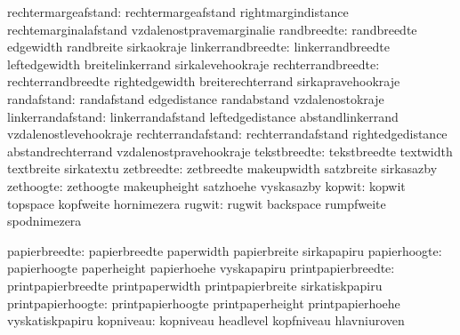           rechtermargeafstand:  rechtermargeafstand          rightmargindistance
                                rechtemarginalafstand        vzdalenostpravemarginalie
                  randbreedte:  randbreedte                  edgewidth
                                randbreite                   sirkaokraje
            linkerrandbreedte:  linkerrandbreedte            leftedgewidth
                                breitelinkerrand             sirkalevehookraje
           rechterrandbreedte:  rechterrandbreedte           rightedgewidth
                                breiterechterrand            sirkapravehookraje
                  randafstand:  randafstand                  edgedistance
                                randabstand                  vzdalenostokraje
            linkerrandafstand:  linkerrandafstand            leftedgedistance
                                abstandlinkerrand            vzdalenostlevehookraje
           rechterrandafstand:  rechterrandafstand           rightedgedistance
                                abstandrechterrand           vzdalenostpravehookraje
                 tekstbreedte:  tekstbreedte                 textwidth
                                textbreite                   sirkatextu
                   zetbreedte:  zetbreedte                   makeupwidth
                                satzbreite                   sirkasazby
                    zethoogte:  zethoogte                    makeupheight
                                satzhoehe                    vyskasazby
                       kopwit:  kopwit                       topspace
                                kopfweite                    hornimezera
                       rugwit:  rugwit                       backspace
                                rumpfweite                   spodnimezera

                papierbreedte:  papierbreedte                paperwidth
                                papierbreite                 sirkapapiru
                 papierhoogte:  papierhoogte                 paperheight
                                papierhoehe                  vyskapapiru
           printpapierbreedte:  printpapierbreedte           printpaperwidth
                                printpapierbreite            sirkatiskpapiru
            printpapierhoogte:  printpapierhoogte            printpaperheight
                                printpapierhoehe             vyskatiskpapiru
                    kopniveau:  kopniveau                    headlevel
                                kopfniveau                   hlavniuroven

